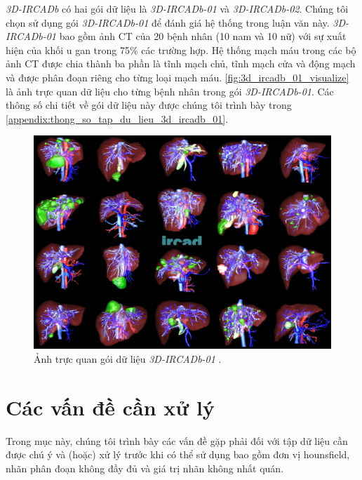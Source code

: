 	\textit{3D-IRCADb} có hai gói dữ liệu là \textit{3D-IRCADb-01} và \textit{3D-IRCADb-02}. Chúng tôi chọn sử dụng gói \textit{3D-IRCADb-01} \cite{3D-IRCADb-01} để đánh giá hệ thống trong luận văn này. \textit{3D-IRCADb-01} bao gồm ảnh CT của 20 bệnh nhân (10 nam và 10 nữ) với sự xuất hiện của khối u gan trong 75\% các trường hợp. Hệ thống mạch máu trong các bộ ảnh CT được chia thành ba phần là tĩnh mạch chủ, tĩnh mạch cửa và động mạch và được phân đoạn riêng cho từng loại mạch máu. \autoref{fig:3d_ircadb_01_visualize} là ảnh trực quan dữ liệu cho từng bệnh nhân trong gói \textit{3D-IRCADb-01}. Các thông số chi tiết về gói dữ liệu này được chúng tôi trình bày trong \autoref{appendix:thong_so_tap_du_lieu_3d_ircadb_01}.
	\vfill
	\begin{figure}[h!]
		\centering
		\includegraphics[width=\textwidth, height=.672\textwidth]{figures/ircad_dataset}
		\caption[Ảnh trực quan gói dữ liệu \textit{3D-IRCADb-01}.]{Ảnh trực quan gói dữ liệu \textit{3D-IRCADb-01} .}
		\label{fig:3d_ircadb_01_visualize}
	\end{figure}

\section{Các vấn đề cần xử lý}
\label{sec:cac_van_de_can_xu_ly}
	Trong mục này, chúng tôi trình bày các vấn đề gặp phải đối với tập dữ liệu cần được chú ý và (hoặc) xử lý trước khi có thể sử dụng bao gồm đơn vị hounsfield, nhãn phân đoạn không đầy đủ và giá trị nhãn không nhất quán.
	
